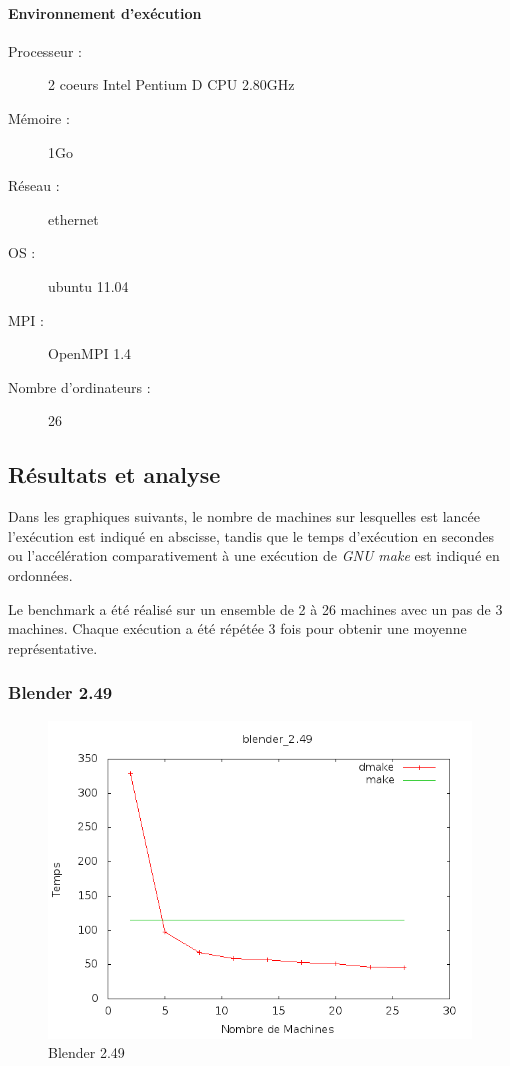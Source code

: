 \documentclass[a4paper,12pt,twoside]{article}
\begin{document}
\paragraph{Environnement d'exécution}
\begin{description}
\item[Processeur :] 2 coeurs Intel Pentium D CPU 2.80GHz
\item[Mémoire :] 1Go
\item[Réseau :] ethernet
\item[OS :] ubuntu 11.04
\item[MPI :] OpenMPI 1.4
\item[Nombre d’ordinateurs :] 26
\end{description}

\subsection{Résultats et analyse}

Dans les graphiques suivants, le nombre de machines sur lesquelles est
lancée l'exécution est indiqué en abscisse, tandis que le temps
d'exécution en secondes ou l'accélération comparativement à une
exécution de \emph{GNU make} est indiqué en ordonnées.

Le benchmark a été réalisé sur un ensemble de 2 à 26 machines avec un pas de 3 machines. Chaque
exécution a été répétée 3 fois pour obtenir une moyenne
représentative.


\subsubsection{Blender 2.49}


\begin{figure}[H]
  \centering
  \includegraphics[scale=0.5]{graph_blender_2.49.png}
  \caption{Blender 2.49}
  \label{fig:blender249}
\end{figure}
\end{document}
